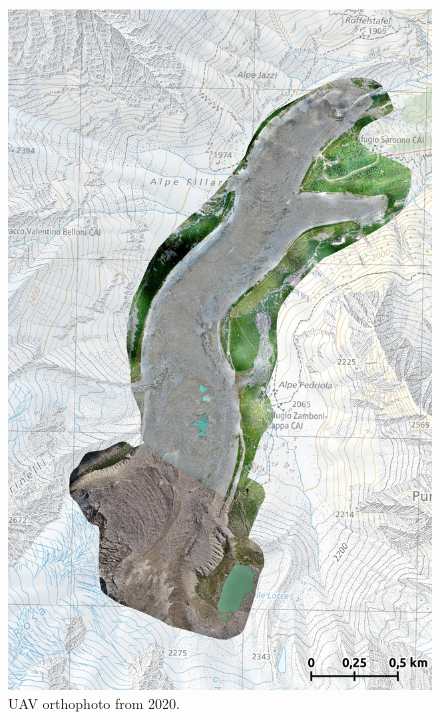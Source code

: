 \begin{figure}[p]
    \centering
    \includegraphics[height=\textheight]{figures/appendix/orto_2020.jpg}
    \caption{UAV orthophoto from 2020.}
\end{figure}

